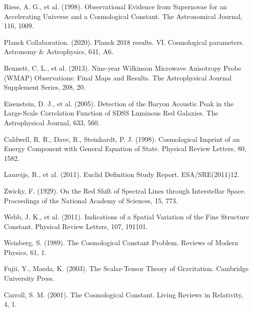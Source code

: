 \documentclass{article}
\begin{document}
\begin{thebibliography}{99}
		 Riess, A. G., et al. (1998). Observational Evidence from Supernovae for an Accelerating Universe and a Cosmological Constant. The Astronomical Journal, 116, 1009.
		
		 Planck Collaboration. (2020). Planck 2018 results. VI. Cosmological parameters. Astronomy \& Astrophysics, 641, A6.
		
		 Bennett, C. L., et al. (2013). Nine-year Wilkinson Microwave Anisotropy Probe (WMAP) Observations: Final Maps and Results. The Astrophysical Journal Supplement Series, 208, 20.
		
		 Eisenstein, D. J., et al. (2005). Detection of the Baryon Acoustic Peak in the Large-Scale Correlation Function of SDSS Luminous Red Galaxies. The Astrophysical Journal, 633, 560.
		
		 Caldwell, R. R., Dave, R., Steinhardt, P. J. (1998). Cosmological Imprint of an Energy Component with General Equation of State. Physical Review Letters, 80, 1582.
		
		 Laureijs, R., et al. (2011). Euclid Definition Study Report. ESA/SRE(2011)12.
		
		 Zwicky, F. (1929). On the Red Shift of Spectral Lines through Interstellar Space. Proceedings of the National Academy of Sciences, 15, 773.
		
		 Webb, J. K., et al. (2011). Indications of a Spatial Variation of the Fine Structure Constant. Physical Review Letters, 107, 191101.
		
		 Weinberg, S. (1989). The Cosmological Constant Problem. Reviews of Modern Physics, 61, 1.
		
		 Fujii, Y., Maeda, K. (2003). The Scalar-Tensor Theory of Gravitation. Cambridge University Press.
		
		 Carroll, S. M. (2001). The Cosmological Constant. Living Reviews in Relativity, 4, 1.
	\end{thebibliography}
	
\end{document}
